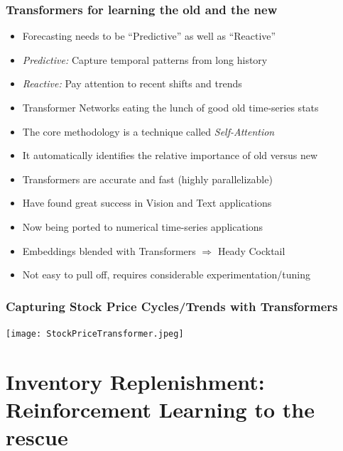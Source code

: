 \documentclass[handout]{beamer}
\begin{document}
\begin{frame}
\frametitle{Transformers for learning the old and the new}
\pause
\begin{itemize}[<+->]
\item Forecasting needs to be ``Predictive'' as well as ``Reactive''
\item {\em Predictive:} Capture temporal patterns from long history
\item {\em Reactive:} Pay attention to recent shifts and trends
\item Transformer Networks eating the lunch of good old time-series stats
\item The core methodology is a technique called {\em Self-Attention}
\item It automatically identifies the relative importance of old versus new
\item Transformers are accurate and fast (highly parallelizable)
\item Have found great success in Vision and Text applications
\item Now being ported to numerical time-series applications
\item Embeddings blended with Transformers $\Rightarrow$ Heady Cocktail
\item Not easy to pull off, requires considerable experimentation/tuning
\end{itemize}
\end{frame}

\begin{frame}
\frametitle{Capturing Stock Price Cycles/Trends with Transformers}
\texttt{[image: StockPriceTransformer.jpeg]}
\end{frame}

\section{Inventory Replenishment: Reinforcement Learning to the rescue}
\end{document}
